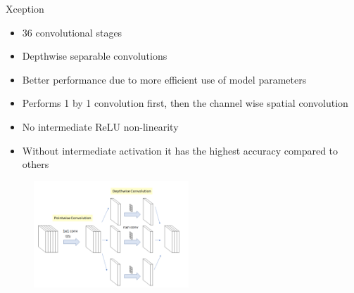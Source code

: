 \documentclass[leqno]{beamer}
\begin{document}
\begin{frame}{Xception}
    \begin{itemize}
        \item 36 convolutional stages
        \item Depthwise separable convolutions
        \item Better performance due to more efficient use of model parameters
        \item Performs 1 by 1 convolution first, then the channel wise spatial convolution
        \item No intermediate ReLU non-linearity
        \item Without intermediate activation it has the highest accuracy compared to others
    \end{itemize}
    \begin{figure}
        \includegraphics[height=4cm]{XceptionModel.jpg}
    \end{figure}
\end{frame}
\end{document}

